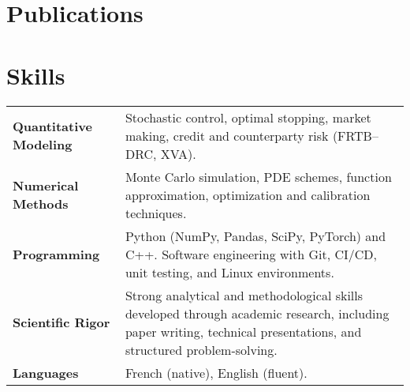 \documentclass[a4paper,11pt]{article}
\begin{document}
	\section{Publications}
	\begin{refsection}
	\nocite{*}
	\printbibliography[heading=none]
	\end{refsection}

	\section{Skills}
	\begin{tabularx}{\linewidth}{@{}l X@{}}
		\textbf{Quantitative Modeling} & Stochastic control, optimal stopping, market making, credit and counterparty risk (FRTB–DRC, XVA). \\
		\textbf{Numerical Methods} & Monte Carlo simulation, PDE schemes, function approximation, optimization and calibration techniques. \\
		\textbf{Programming} & Python (NumPy, Pandas, SciPy, PyTorch) and C++. Software engineering with Git, CI/CD, unit testing, and Linux environments. \\
		\textbf{Scientific Rigor} & Strong analytical and methodological skills developed through academic research, including paper writing, technical presentations, and structured problem-solving. \\
		\textbf{Languages} & French (native), English (fluent). 
	\end{tabularx}
\end{document}
